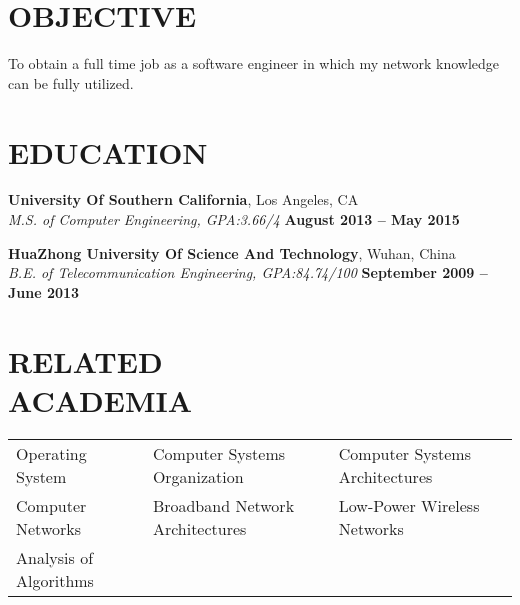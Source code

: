 \documentclass[margin,line]{resume}
\begin{document}
\begin{resume}

\vspace{1mm}
	\section{\mysidestyle \textbf{\large{O}\small{BJECTIVE}}}
	To obtain a full time job as a software engineer in which my network knowledge can be fully utilized.

	\sectionline

    \section{\mysidestyle \textbf{\large{E}\small{DUCATION}}}
    \textbf{\listing University Of Southern California}, Los Angeles, CA \vspace{2mm}\\\vspace{1mm}%
    \textsl{M.S. of Computer Engineering, GPA:3.66/4} \hfill \textbf{August 2013 -- May 2015}\vspace{-3mm}\\\vspace{-1mm}%

    \textbf{\listing HuaZhong University Of Science And Technology}, Wuhan, China \vspace{2mm}\\\vspace{1mm}%
    \textsl{B.E. of Telecommunication Engineering, GPA:84.74/100} \hfill \textbf{September 2009 -- June 2013}\vspace{-3mm}\\\vspace{-1mm}%


\sectionline

    \section{\mysidestyle \textbf{\large{R}\small{ELATED\\ACADEMIA}}} 

	\vspace{1mm} %
	\begin{tabular}{@{}p{4cm}p{5.5cm}p{5.5cm}}
	Operating System     &  Computer Systems Organization        &  Computer Systems Architectures\\
	Computer Networks    &  Broadband Network Architectures      &  Low-Power Wireless Networks\\
	Analysis of Algorithms %
	\vspace{3mm}
	\end{tabular}



\end{resume}
\end{document}
